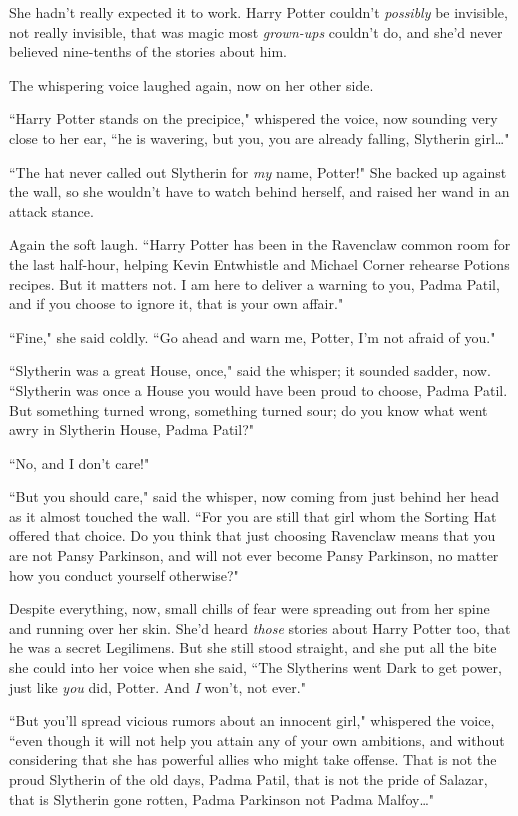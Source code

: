 She hadn't really expected it to work. Harry Potter couldn't \emph{possibly} be invisible, not really invisible, that was magic most \emph{grown-ups} couldn't do, and she'd never believed nine-tenths of the stories about him.

The whispering voice laughed again, now on her other side.

``Harry Potter stands on the precipice," whispered the voice, now sounding very close to her ear, ``he is wavering, but you, you are already falling, Slytherin girl{\ldots}"

``The hat never called out Slytherin for \emph{my} name, Potter!" She backed up against the wall, so she wouldn't have to watch behind herself, and raised her wand in an attack stance.

Again the soft laugh. ``Harry Potter has been in the Ravenclaw common room for the last half-hour, helping Kevin Entwhistle and Michael Corner rehearse Potions recipes. But it matters not. I am here to deliver a warning to you, Padma Patil, and if you choose to ignore it, that is your own affair."

``Fine," she said coldly. ``Go ahead and warn me, Potter, I'm not afraid of you."

``Slytherin was a great House, once," said the whisper; it sounded sadder, now. ``Slytherin was once a House you would have been proud to choose, Padma Patil. But something turned wrong, something turned sour; do you know what went awry in Slytherin House, Padma Patil?"

``No, and I don't care!"

``But you should care," said the whisper, now coming from just behind her head as it almost touched the wall. ``For you are still that girl whom the Sorting Hat offered that choice. Do you think that just choosing Ravenclaw means that you are not Pansy Parkinson, and will not ever become Pansy Parkinson, no matter how you conduct yourself otherwise?"

Despite everything, now, small chills of fear were spreading out from her spine and running over her skin. She'd heard \emph{those} stories about Harry Potter too, that he was a secret Legilimens. But she still stood straight, and she put all the bite she could into her voice when she said, ``The Slytherins went Dark to get power, just like \emph{you} did, Potter. And \emph{I} won't, not ever."

``But you'll spread vicious rumors about an innocent girl," whispered the voice, ``even though it will not help you attain any of your own ambitions, and without considering that she has powerful allies who might take offense. That is not the proud Slytherin of the old days, Padma Patil, that is not the pride of Salazar, that is Slytherin gone rotten, Padma Parkinson not Padma Malfoy{\ldots}"

